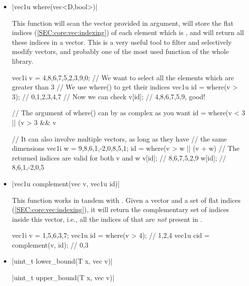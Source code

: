 \documentclass[12pt]{report}
\newenvironment{example}
{
    \begin{mdframed}[style=example,frametitle={Example}]
}
{
    \end{mdframed}
}
\newcommand{\cpptrue}{\cppinline{true}\xspace}
\begin{document}
\begin{itemize}
\item \cppinline|vec1u where(vec<D,bool>)| 

This function will scan the  vector provided in argument, will store the flat indices (\ref{SEC:core:vec:indexing}) of each element which is \cpptrue, and will return all these indices in a vector. This is a very useful tool to filter and selectively modify vectors, and probably one of the most used function of the whole library.

\begin{example}
\begin{cppcode}
vec1i v = {4,8,6,7,5,2,3,9,0};
// We want to select all the elements which are greater than 3
// We use where() to get their indices
vec1u id = where(v > 3); // {0,1,2,3,4,7}
// Now we can check
v[id]; // {4,8,6,7,5,9}, good!

// The argument of where() can by as complex as you want
id = where(v < 3 || (v > 3 && v %

// It can also involve multiple vectors, as long as they have
// the same dimensions
vec1i w = {9,8,6,1,-2,0,8,5,1};
id = where(v > w || (v + w) %
// The returned indices are valid for both v and w
v[id]; // {8,6,7,5,2,9}
w[id]; // {8,6,1,-2,0,5}
\end{cppcode}
\end{example}

\item \cppinline|vec1u complement(vec v, vec1u id)| 

This function works in tandem with . Given a vector  and a set of flat indices  (\ref{SEC:core:vec:indexing}), it will return the complementary set of indices inside this vector, i.e., all the indices of  that are \emph{not} present in .

\begin{example}
\begin{cppcode}
vec1i v = {1,5,6,3,7};
vec1u id = where(v > 4); // {1,2,4}
vec1u cid = complement(v, id); // {0,3}
\end{cppcode}
\end{example}

\item \cppinline|uint_t lower_bound(T x, vec v)| 

\cppinline|uint_t upper_bound(T x, vec v)| 


\end{itemize}
\end{document}

